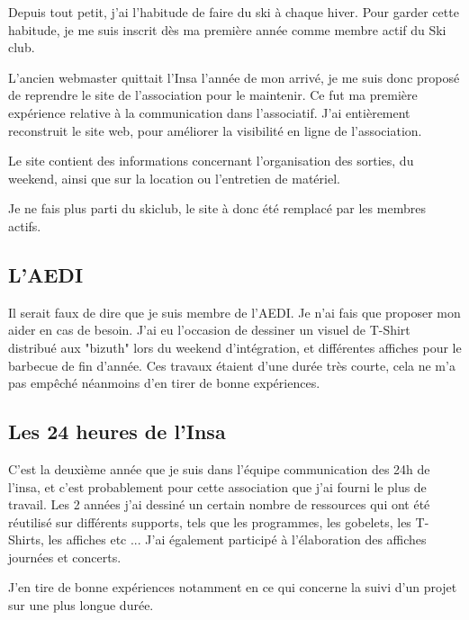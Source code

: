         Depuis tout petit, j'ai l'habitude de faire du ski à chaque hiver. Pour garder cette habitude, je me suis inscrit dès ma première année comme membre actif du Ski club.
        
        L'ancien webmaster quittait l'Insa l'année de mon arrivé, je me suis donc proposé de reprendre le site de l'association pour le maintenir.
        Ce fut ma première expérience relative à la communication dans l'associatif.
        J'ai entièrement reconstruit le site web, pour améliorer la visibilité en ligne de l'association.
        
        Le site contient des informations concernant l'organisation des sorties, du weekend, ainsi que sur la location ou l'entretien de matériel.
        
        Je ne fais plus parti du skiclub, le site à donc été remplacé par les membres actifs.
        
        
    \subsection{L'AEDI}
        
        Il serait faux de dire que je suis membre de l'AEDI. Je n'ai fais que proposer mon aider en cas de besoin.
        J'ai eu l'occasion de dessiner un visuel de T-Shirt distribué aux "bizuth" lors du weekend d'intégration, et différentes affiches pour le barbecue de fin d'année.
        Ces travaux étaient d'une durée très courte, cela ne m'a pas empêché néanmoins d'en tirer de bonne expériences.
        
        
    \subsection{Les 24 heures de l'Insa}
        
        C'est la deuxième année que je suis dans l'équipe communication des 24h de l'insa, et c'est probablement pour cette association que j'ai fourni le plus de travail.
        Les 2 années j'ai dessiné un certain nombre de ressources qui ont été réutilisé sur différents supports, tels que les programmes, les gobelets, les T-Shirts, les affiches etc ...
        J'ai également participé à l'élaboration des affiches journées et concerts.
        
        J'en tire de bonne expériences notamment en ce qui concerne la suivi d'un projet sur une plus longue durée.
        
